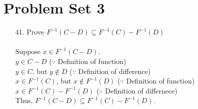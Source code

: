 \documentclass[12pt]{article}
\begin{document}
\section*{Problem Set 3}
\begin{itemize}
    \item [41.]
        Prove $F^{-1}(C - D) \subseteq F^{-1}(C) - F^{-1}(D)$ \\
        \\
        Suppose $x \in F^{-1}(C - D)$. \\
        $y \in C - D$ \hspace{10em} ($\because$ Definition of function) \\
        $y \in C$, but $y \notin D$ \hspace{8em} ($\because$ Definition of difference) \\
        $x \in F^{-1}(C)$, but $x \notin F^{-1}(D)$ \hspace{3em} ($\because$ Definition
            of function) \\
        $x \in F^{-1}(C) - F^{-1}(D)$ \hspace{5em} ($\because$ Definition of differnece) \\
        Thus, $F^{-1}(C - D) \subseteq F^{-1}(C) - F^{-1}(D)$.\\

\end{itemize}
\end{document}
